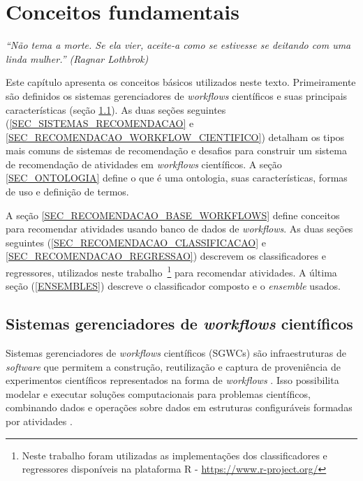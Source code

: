 \chapter{Conceitos fundamentais}\label{CAP_CONCEITOS_FUNDAMENTAIS}
\begin{flushright}
	\textit{``Não tema a morte. Se ela vier, aceite-a como se estivesse se deitando com uma linda mulher.'' (Ragnar Lothbrok)}
\end{flushright}

Este capítulo apresenta os conceitos básicos utilizados neste texto. Primeiramente são definidos os sistemas gerenciadores de \emph{workflows} científicos e suas principais características (seção \ref{SEC_SISTEMA_GERENCIADOR_WORKFLOW}). As duas seções seguintes (\ref{SEC_SISTEMAS_RECOMENDACAO} e \ref{SEC_RECOMENDACAO_WORKFLOW_CIENTIFICO}) detalham os tipos mais comuns de sistemas de recomendação e desafios para construir um sistema de recomendação de atividades em \emph{workflows} científicos. A seção \ref{SEC_ONTOLOGIA} define o que é uma ontologia, suas características, formas de uso e definição de termos.

A seção \ref{SEC_RECOMENDACAO_BASE_WORKFLOWS} define conceitos para recomendar atividades usando banco de dados de \emph{workflows}. As duas seções seguintes (\ref{SEC_RECOMENDACAO_CLASSIFICACAO} e \ref{SEC_RECOMENDACAO_REGRESSAO}) descrevem os classificadores e regressores, utilizados neste trabalho~\footnote{Neste trabalho foram utilizadas as implementações dos classificadores e regressores disponíveis na plataforma R - \url{https://www.r-project.org/}} para recomendar atividades. A última seção (\ref{ENSEMBLES}) descreve o classificador composto e o \emph{ensemble} usados.

\section{Sistemas gerenciadores de \emph{workflows} científicos}\label{SEC_SISTEMA_GERENCIADOR_WORKFLOW}
Sistemas gerenciadores de \emph{workflows} científicos (SGWCs) são infraestruturas de \emph{software} que permitem a construção, reutilização e captura de proveniência de experimentos científicos representados na forma de \emph{workflows} \cite{McPhillips2009}. Isso possibilita modelar e executar soluções computacionais para problemas científicos, combinando dados e operações sobre dados em estruturas configuráveis formadas por atividades \cite{Garijo2014}.

